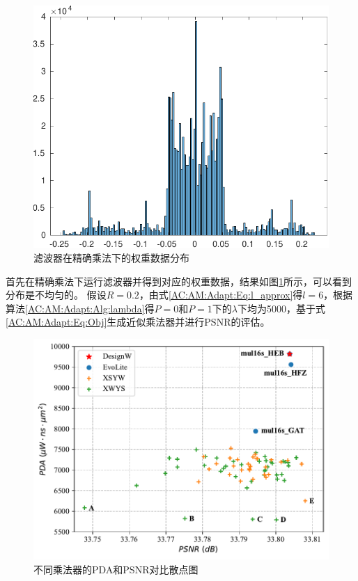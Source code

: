 \begin{figure}[!ht]
    \centering
    \includegraphics[width=0.9\linewidth]{./figs/AC-AM-Adapt-FIR-weight_distribution.pdf}
    \caption{滤波器在精确乘法下的权重数据分布}
    \label{AC:AM:Adapt:FIR:Fig:weight_distribution}
\end{figure}

首先在精确乘法下运行滤波器并得到对应的权重数据，结果如图\ref{AC:AM:Adapt:FIR:Fig:weight_distribution}所示，可以看到分布是不均匀的。
假设$R=0.2$，由式\ref{AC:AM:Adapt:Eq:l_approx}得$l=6$，根据算法\ref{AC:AM:Adapt:Alg:lambda}得$P=0$和$P=1$下的$\lambda$下均为5000，基于式\eqref{AC:AM:Adapt:Eq:Obj}生成近似乘法器并进行PSNR的评估。

\begin{figure}[!ht]
    \centering
    \includegraphics[width=0.9\linewidth]{./figs/AC-AM-Adapt-FIR-PSNR_PDA.pdf}
    \caption{不同乘法器的PDA和PSNR对比散点图}
    \label{AC:AM:Adapt:FIR:Fig:PSNR_PDA}
\end{figure}

